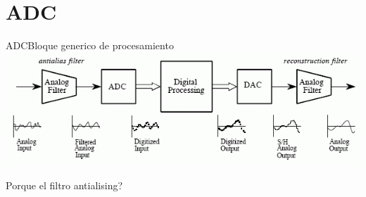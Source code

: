  \section{ADC}
 \begin{frame}{ADC}{Bloque generico de procesamiento}
    \center\includegraphics[width=1\textwidth]{1_clase/adc_dac}
    \begin{alertblock} {Porque el filtro antialising?}
    \end{alertblock}
    \vfill
 \end{frame}

